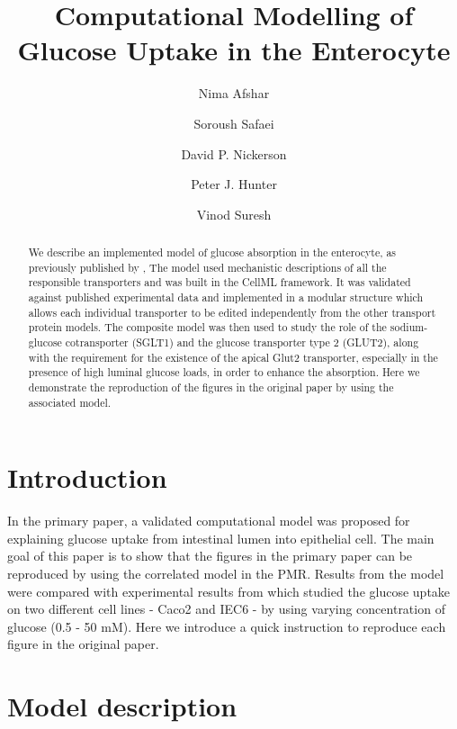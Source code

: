 \documentclass[fleqn,10pt]{physiome}
\title{Computational Modelling of Glucose Uptake in the Enterocyte}
\author[1][nima.afshar@auckland.ac.nz]{Nima Afshar}
\author[1]{Soroush Safaei}
\author[1]{David P. Nickerson}
\author[1]{Peter J. Hunter}
\author[1,2]{Vinod Suresh}
\affil[1]{Auckland Bioengineering Institute, University of Auckland,New Zealand}
\affil[2]{Department of Engineering Science, University of Auckland,New Zealand}
\begin{document}
\maketitle

\begin{abstract}
We describe an implemented model of glucose absorption in the enterocyte, as previously published by \cite{afshar2019computational}, The model used mechanistic descriptions of all the responsible transporters and was built in the CellML framework. It was validated against published experimental data and implemented in a modular structure which allows each individual transporter to be edited independently from the other transport protein models. The composite model was then used to study the role of the sodium-glucose
cotransporter (SGLT1) and the glucose transporter type 2 (GLUT2), along with the requirement for the existence of the apical Glut2 transporter, especially in the presence of high luminal glucose loads, in order to enhance the absorption. Here we demonstrate the reproduction of the figures in the original paper by using the associated model.
\end{abstract}



\section{Introduction}

In the primary paper, a validated computational model was proposed for explaining glucose uptake from intestinal lumen into epithelial cell. The main goal of this paper is to show that the figures in the primary paper can be reproduced by using the correlated model in the PMR. Results from the model were compared with experimental results from \cite{zheng2012mechanisms} which studied the glucose uptake on two different cell lines - Caco2 and IEC6 - by using varying concentration of glucose (0.5 - 50 mM).
Here we introduce a quick instruction to reproduce each figure in the original paper. 

\section{Model description}
\end{document}
